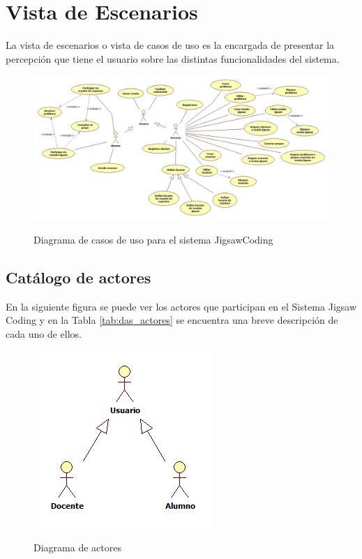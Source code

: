 \section{Vista de Escenarios}
La vista de escenarios o vista de casos de uso es la encargada de presentar la percepción que tiene el usuario sobre las distintas funcionalidades del sistema.
\begin{landscape}

\begin{figure}[!h]
  \centering
  \includegraphics[scale=0.45]{figuras/casosdeuso/casos_de_uso.jpg}\\
  \caption[Casos de uso]{Diagrama de casos de uso para el sistema JigsawCoding}
  \label{fig:casos_de_uso}
\end{figure}
\end{landscape}

\subsection{Catálogo de actores}
En la siguiente figura se puede ver los actores que participan en el Sistema Jigsaw Coding y en la Tabla \ref{tab:das_actores} se encuentra una breve descripción de cada uno de ellos.
\begin{figure}
	\centering
	\includegraphics[scale=0.6]{figuras/casosdeuso/actores.jpg}\\
	\caption[Diagrama de actores]{Diagrama de actores}
	\label{fig:das_actores}
\end{figure}

